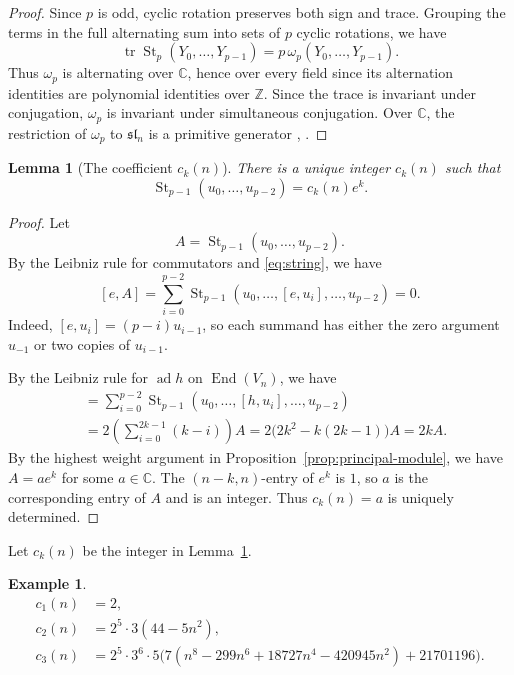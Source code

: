 \documentclass[12pt]{article}
\newtheorem{lemma}[theorem]{Lemma}
\theoremstyle{definition}
\newtheorem{example}[theorem]{Example}
\theoremstyle{remark}
\DeclareMathOperator{\St}{St}
\DeclareMathOperator{\ad}{ad}
\DeclareMathOperator{\tr}{tr}
\DeclareMathOperator{\End}{End}
\newcommand{\C}{\mathbb C}
\newcommand{\Z}{\mathbb Z}
\begin{document}
\begin{proof}
Since $p$ is odd, cyclic rotation preserves both sign and trace.
Grouping the terms in the full alternating sum into sets of $p$
cyclic rotations, we have
\[
 \tr\St_p(Y_0,\ldots,Y_{p-1})
 =p\,\omega_p(Y_0,\ldots,Y_{p-1}).
\]
Thus $\omega_p$ is alternating over $\C$, hence over every field
since its alternation identities are polynomial identities over $\Z$.
Since the trace is invariant under conjugation, $\omega_p$ is
invariant under simultaneous conjugation. Over $\C$, the restriction
of $\omega_p$ to $\mathfrak{sl}_n$ is a primitive generator
\cite[p.~141]{Dynkin1954}, \cite[Section 5.5, p.~261]{Kostant1958}.
\end{proof}

\begin{lemma}[The coefficient $c_k(n)$]\label{lem:coefficient}
There is a unique integer $c_k(n)$ such that
\begin{equation}\label{eq:coefficient-identity}
 \St_{p-1}(u_0,\ldots,u_{p-2})=c_k(n)e^k.
\end{equation}
\end{lemma}

\begin{proof}
Let
\[
 A=\St_{p-1}(u_0,\ldots,u_{p-2}).
\]
By the Leibniz rule for commutators and \eqref{eq:string}, we have
\[
 [e,A]=\sum_{i=0}^{p-2}
 \St_{p-1}(u_0,\ldots,[e,u_i],\ldots,u_{p-2})=0.
\]
Indeed, $[e,u_i]=(p-i)u_{i-1}$, so each summand has either the zero
argument $u_{-1}$ or two copies of $u_{i-1}$.

By the Leibniz rule for $\ad h$ on $\End(V_n)$, we have
\begin{align*}
 [h,A]
 &=\sum_{i=0}^{p-2}
   \St_{p-1}(u_0,\ldots,[h,u_i],\ldots,u_{p-2})\\
 &=2\left(\sum_{i=0}^{2k-1}(k-i)\right)A
 =2\bigl(2k^2-k(2k-1)\bigr)A=2kA.
\end{align*}
By the highest weight argument in Proposition~\ref{prop:principal-module},
we have $A=ae^k$ for some $a\in\C$.
The $(n-k,n)$-entry of $e^k$ is $1$, so $a$ is the corresponding
entry of $A$ and is an integer. Thus $c_k(n)=a$ is uniquely determined.
\end{proof}

\newpage
Let $c_k(n)$ be the integer in Lemma~\ref{lem:coefficient}.

\begin{example}\label{ex:coefficients}
\begin{align*}
 c_1(n)&=2,\\
 c_2(n)&=2^5\cdot3(44-5n^2),\\
 c_3(n)&=2^5\cdot3^6\cdot5\bigl(7(n^8-299n^6+18727n^4-420945n^2)+21701196\bigr).
\end{align*}
\end{example}
\end{document}
